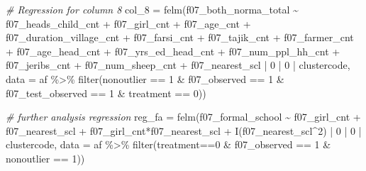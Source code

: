 \documentclass[
]{article}
\newenvironment{Shaded}{\begin{snugshade}}{\end{snugshade}}
\newcommand{\AttributeTok}[1]{\textcolor[rgb]{0.77,0.63,0.00}{#1}}
\newcommand{\CommentTok}[1]{\textcolor[rgb]{0.56,0.35,0.01}{\textit{#1}}}
\newcommand{\DecValTok}[1]{\textcolor[rgb]{0.00,0.00,0.81}{#1}}
\newcommand{\FunctionTok}[1]{\textcolor[rgb]{0.00,0.00,0.00}{#1}}
\newcommand{\NormalTok}[1]{#1}
\newcommand{\OtherTok}[1]{\textcolor[rgb]{0.56,0.35,0.01}{#1}}
\newcommand{\SpecialCharTok}[1]{\textcolor[rgb]{0.00,0.00,0.00}{#1}}
\begin{document}
\begin{Shaded}
\begin{Highlighting}[]
\CommentTok{\# Regression for column 8}
\NormalTok{col\_8 }\OtherTok{=} \FunctionTok{felm}\NormalTok{(f07\_both\_norma\_total }\SpecialCharTok{\textasciitilde{}}\NormalTok{ f07\_heads\_child\_cnt }\SpecialCharTok{+} 
\NormalTok{               f07\_girl\_cnt }\SpecialCharTok{+}\NormalTok{ f07\_age\_cnt }\SpecialCharTok{+}\NormalTok{ f07\_duration\_village\_cnt }\SpecialCharTok{+} 
\NormalTok{               f07\_farsi\_cnt }\SpecialCharTok{+}\NormalTok{ f07\_tajik\_cnt }\SpecialCharTok{+}\NormalTok{ f07\_farmer\_cnt }\SpecialCharTok{+} 
\NormalTok{               f07\_age\_head\_cnt }\SpecialCharTok{+}\NormalTok{ f07\_yrs\_ed\_head\_cnt }\SpecialCharTok{+}\NormalTok{ f07\_num\_ppl\_hh\_cnt }\SpecialCharTok{+} 
\NormalTok{               f07\_jeribs\_cnt }\SpecialCharTok{+}\NormalTok{ f07\_num\_sheep\_cnt }\SpecialCharTok{+}\NormalTok{ f07\_nearest\_scl}
             \SpecialCharTok{|} \DecValTok{0} \SpecialCharTok{|} \DecValTok{0} \SpecialCharTok{|}\NormalTok{ clustercode, }
             \AttributeTok{data =}\NormalTok{ af }\SpecialCharTok{\%\textgreater{}\%} 
               \FunctionTok{filter}\NormalTok{(nonoutlier }\SpecialCharTok{==} \DecValTok{1} \SpecialCharTok{\&}\NormalTok{ f07\_observed }\SpecialCharTok{==} \DecValTok{1} \SpecialCharTok{\&} 
\NormalTok{                        f07\_test\_observed }\SpecialCharTok{==} \DecValTok{1} \SpecialCharTok{\&}\NormalTok{ treatment }\SpecialCharTok{==} \DecValTok{0}\NormalTok{))}
\end{Highlighting}
\end{Shaded}

\begin{Shaded}
\begin{Highlighting}[]
\CommentTok{\# further analysis regression}
\NormalTok{reg\_fa }\OtherTok{=} \FunctionTok{felm}\NormalTok{(f07\_formal\_school }\SpecialCharTok{\textasciitilde{}}\NormalTok{ f07\_girl\_cnt }\SpecialCharTok{+} 
\NormalTok{         f07\_nearest\_scl }\SpecialCharTok{+}\NormalTok{ f07\_girl\_cnt}\SpecialCharTok{*}\NormalTok{f07\_nearest\_scl }\SpecialCharTok{+} 
         \FunctionTok{I}\NormalTok{(f07\_nearest\_scl}\SpecialCharTok{\^{}}\DecValTok{2}\NormalTok{) }\SpecialCharTok{|} \DecValTok{0} \SpecialCharTok{|} \DecValTok{0} \SpecialCharTok{|}\NormalTok{ clustercode,}
         \AttributeTok{data =}\NormalTok{ af }\SpecialCharTok{\%\textgreater{}\%} \FunctionTok{filter}\NormalTok{(treatment}\SpecialCharTok{==}\DecValTok{0} \SpecialCharTok{\&} 
\NormalTok{                              f07\_observed }\SpecialCharTok{==} \DecValTok{1} \SpecialCharTok{\&}
\NormalTok{                              nonoutlier }\SpecialCharTok{==} \DecValTok{1}\NormalTok{))}
\end{Highlighting}
\end{Shaded}
\end{document}
